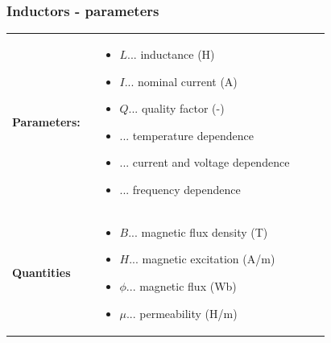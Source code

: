 \documentclass{beamer}
\begin{document}
	\begin{frame}
    \frametitle{Inductors - parameters}
		\begin{tabular}{p{0.25\linewidth} p{0.65\linewidth}}
		\textbf{Parameters:} &
		\begin{itemize}
			\item $L$... inductance (H)
			\item $I$... nominal current (A)
			\item $Q$... quality factor (-)
			\item ... temperature dependence
			\item ... current and voltage dependence
			\item ... frequency dependence
		\end{itemize} \\
		\textbf{Quantities} &
		\begin{itemize}
			\item $B$... magnetic flux density (T)
			\item $H$... magnetic excitation (A/m)
			\item $\phi$... magnetic flux (Wb)
			\item $\mu$... permeability (H/m)
		\end{itemize}
		\end{tabular}
  \end{frame}
\end{document}
